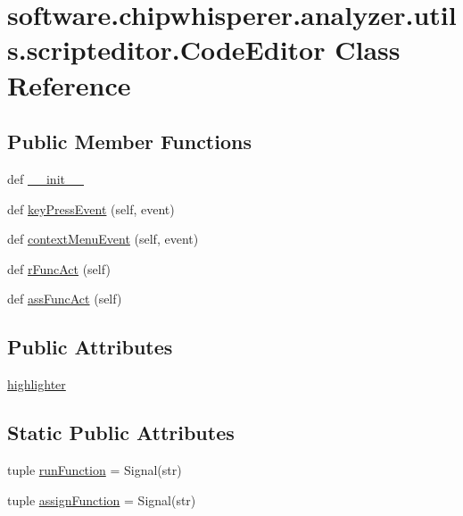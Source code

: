 \hypertarget{classsoftware_1_1chipwhisperer_1_1analyzer_1_1utils_1_1scripteditor_1_1CodeEditor}{}\section{software.\+chipwhisperer.\+analyzer.\+utils.\+scripteditor.\+Code\+Editor Class Reference}
\label{classsoftware_1_1chipwhisperer_1_1analyzer_1_1utils_1_1scripteditor_1_1CodeEditor}
\subsection*{Public Member Functions}
\begin{DoxyCompactItemize}
\item 
def \hyperlink{classsoftware_1_1chipwhisperer_1_1analyzer_1_1utils_1_1scripteditor_1_1CodeEditor_a35a9b17974a4f7e5ad7caa945299d688}{\+\_\+\+\_\+init\+\_\+\+\_\+}
\item 
def \hyperlink{classsoftware_1_1chipwhisperer_1_1analyzer_1_1utils_1_1scripteditor_1_1CodeEditor_a99b1240a617210f971b63568d8e2ec20}{key\+Press\+Event} (self, event)
\item 
def \hyperlink{classsoftware_1_1chipwhisperer_1_1analyzer_1_1utils_1_1scripteditor_1_1CodeEditor_a40222c4cb4f6969ec06214e179aa0831}{context\+Menu\+Event} (self, event)
\item 
def \hyperlink{classsoftware_1_1chipwhisperer_1_1analyzer_1_1utils_1_1scripteditor_1_1CodeEditor_ab626b3abe7bd6d578b1a78a5b95481fc}{r\+Func\+Act} (self)
\item 
def \hyperlink{classsoftware_1_1chipwhisperer_1_1analyzer_1_1utils_1_1scripteditor_1_1CodeEditor_a111683c8e1e9deca78f4f56b72f5befb}{ass\+Func\+Act} (self)
\end{DoxyCompactItemize}
\subsection*{Public Attributes}
\begin{DoxyCompactItemize}
\item 
\hyperlink{classsoftware_1_1chipwhisperer_1_1analyzer_1_1utils_1_1scripteditor_1_1CodeEditor_a131d73170dc9a8e02972083066771167}{highlighter}
\end{DoxyCompactItemize}
\subsection*{Static Public Attributes}
\begin{DoxyCompactItemize}
\item 
tuple \hyperlink{classsoftware_1_1chipwhisperer_1_1analyzer_1_1utils_1_1scripteditor_1_1CodeEditor_acf04b5a4626c3118d07213612582d8ec}{run\+Function} = Signal(str)
\item 
tuple \hyperlink{classsoftware_1_1chipwhisperer_1_1analyzer_1_1utils_1_1scripteditor_1_1CodeEditor_a2b1f86d6c9f733319a8d68eef5b2c420}{assign\+Function} = Signal(str)
\end{DoxyCompactItemize}


